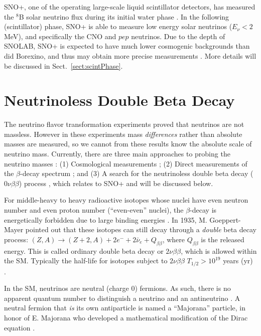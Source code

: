 SNO+, one of the operating large-scale liquid scintillator detectors, has measured the $^8$B solar neutrino flux during its initial water phase \cite{anderson2019measurement}. In the following (scintillator) phase, SNO+ is able to measure low energy solar neutrinos ($E_\nu<2$ MeV), and specifically the CNO and $pep$ neutrinos. Due to the depth of SNOLAB, SNO+ is expected to have much lower cosmogenic backgrounds than did Borexino, and thus may obtain more precise measurements \cite{directorReview}. More details will be discussed in Sect.~\ref{sect:scintPhase}.

\section{Neutrinoless Double Beta Decay}\label{sect:doublebeta}

The neutrino flavor transformation experiments proved that neutrinos are not massless. However in these experiments mass {\em differences} rather than absolute masses are measured, so we cannot from these results know the absolute scale of neutrino mass. Currently, there are three main approaches to probing the neutrino masses \cite{valle2015neutrinos}: (1) Cosmological measurements \cite{aghanim2020planck,dvorkin2019neutrino,lesgourgues2013neutrino}; (2) Direct measurements of the $\beta$-decay spectrum \cite{aker2019improved}; and (3) A search for the neutrinoless double beta decay ($0\nu\beta\beta$) process \cite{furry1939transition,haxton1981double}, which relates to SNO+ and will be discussed below.

For middle-heavy to heavy radioactive isotopes whose nuclei have even neutron number and even proton number (``even-even'' nuclei), the $\beta$-decay is energetically forbidden due to large binding energies \cite{fukugita2013physics}. In 1935, M. Goeppert-Mayer pointed out that these isotopes can still decay through a {\em double} beta decay process: $(Z,A) \to (Z+2,A)+2e^{-}+2\bar{\nu}_e+Q_{\beta\beta}$, where $Q_{\beta\beta}$ is the released energy. This is called ordinary double beta decay or $2\nu\beta\beta$, which is allowed within the SM. Typically the half-life for isotopes subject to $2\nu\beta\beta$ $T_{1/2}>10^{19}$ years (yr) \cite{povh2008particles,martin2019nuclear}.

In the SM, neutrinos are neutral (charge 0) fermions. As such, there is no apparent quantum number to distinguish a neutrino and an antineutrino \cite{akhmedov2014majorana}. A neutral fermion that {\em is} its own antiparticle is named a ``Majorana'' particle, in honor of E. Majorana who developed a mathematical modification of the Dirac equation \cite{majorana2006symmetric}.

